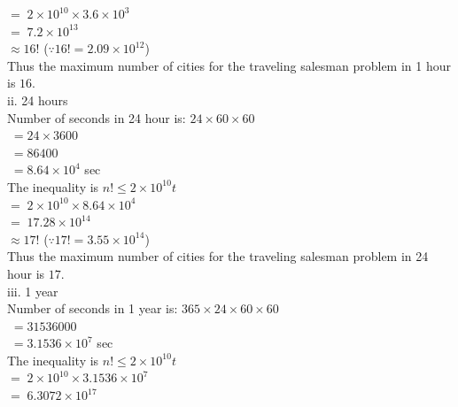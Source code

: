 \documentclass{article}
\begin{document}
\indent \indent \indent \indent \indent \indent \indent $= \; 2 \times 10^{10} \times 3.6 \times 10^3$ \\
\indent \indent \indent \indent \indent \indent \indent $= \; 7.2 \times 10^{13}$ \\
\indent \indent \indent \indent \indent \indent \indent $\approx 16!$ \indent ($\because 16! = 2.09 \times 10^{12}$) \\
\indent Thus the maximum number of cities for the traveling salesman problem in 1 hour is $16$. \\
ii. 24 hours \\
\indent Number of seconds in 24 hour is: $24 \times 60 \times 60$ \\ 
\indent \indent \indent \indent \indent \indent \indent \indent \indent \indent $\; = 24 \times 3600$ \\
\indent \indent \indent \indent \indent \indent \indent \indent \indent \indent $\; = 86400$ \\
\indent \indent \indent \indent \indent \indent \indent \indent \indent \indent $\; = 8.64 \times 10^4$ sec \\
\indent The inequality is $n! \le 2 \times 10^{10}t$ \\
\indent \indent \indent \indent \indent \indent \indent $= \; 2 \times 10^{10} \times 8.64 \times 10^4$ \\
\indent \indent \indent \indent \indent \indent \indent $= \; 17.28 \times 10^{14}$ \\
\indent \indent \indent \indent \indent \indent \indent $\approx 17!$ \indent ($\because 17! = 3.55 \times 10^{14}$) \\
\indent Thus the maximum number of cities for the traveling salesman problem in 24 hour is $17$. \\
iii. 1 year \\ 
\indent Number of seconds in 1 year is: $365 \times 24 \times 60 \times 60$ \\ 
\indent \indent \indent \indent \indent \indent \indent \indent \indent \indent $\; = 31536000$ \\
\indent \indent \indent \indent \indent \indent \indent \indent \indent \indent $\; = 3.1536 \times 10^7$ sec \\
\indent The inequality is $n! \le 2 \times 10^{10}t$ \\
\indent \indent \indent \indent \indent \indent \indent $= \; 2 \times 10^{10} \times 3.1536 \times 10^7$ \\
\indent \indent \indent \indent \indent \indent \indent $= \; 6.3072 \times 10^{17}$ \\
\end{document}
